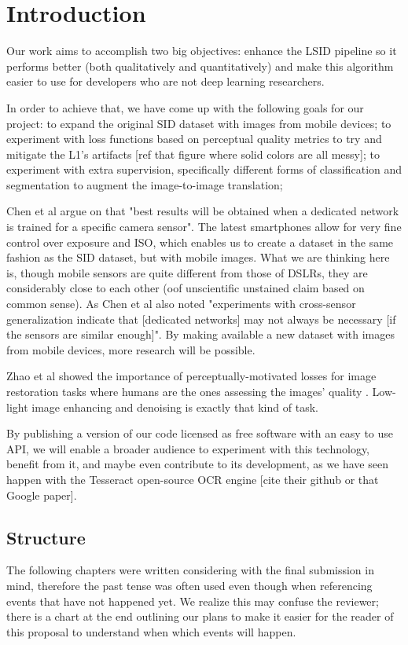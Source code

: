 \chapter{Introduction}
Our work aims to accomplish two big objectives:
enhance the LSID pipeline so it performs better (both qualitatively and quantitatively) and make this algorithm easier to use for developers who are not deep learning researchers.

In order to achieve that, we have come up with the following goals for our project:
to expand the original SID dataset with images from mobile devices;
to experiment with loss functions based on perceptual quality metrics to try and mitigate the L1's artifacts [ref that figure where solid colors are all messy];
to experiment with extra supervision, specifically different forms of classification and segmentation to augment the image-to-image translation;


Chen et al argue on \cite{DBLP:conf/cvpr/ChenCXK18:lsid} that "best results will be obtained when a dedicated network is trained for a specific camera sensor".
The latest smartphones allow for very fine control over exposure and ISO, which enables us to create a dataset in the same fashion as the SID dataset, but with mobile images.
What we are thinking here is, though mobile sensors are quite different from those of DSLRs, they are considerably close to each other (oof unscientific unstained claim based on common sense).
As Chen et al also noted "experiments with cross-sensor generalization indicate that [dedicated networks] may not always be necessary [if the sensors are similar enough]".
By making available a new dataset with images from mobile devices, more research will be possible.

Zhao et al showed the importance of perceptually-motivated losses for image restoration tasks where humans are the ones assessing the images' quality \cite{DBLP:journals/tci/ZhaoGFK17:l1ssimloss}.
Low-light image enhancing and denoising is exactly that kind of task.

By publishing a version of our code licensed as free software with an easy to use API, we will enable a broader audience to experiment with this technology, benefit from it, and maybe even contribute to its development, as we have seen happen with the Tesseract open-source OCR engine [cite their github or that Google paper].

\section{Structure}
The following chapters were written considering with the final submission in mind, therefore the past tense was often used even though when referencing events that have not happened yet.
We realize this may confuse the reviewer; there is a chart at the end outlining our plans to make it easier for the reader of this proposal to understand when which events will happen.


